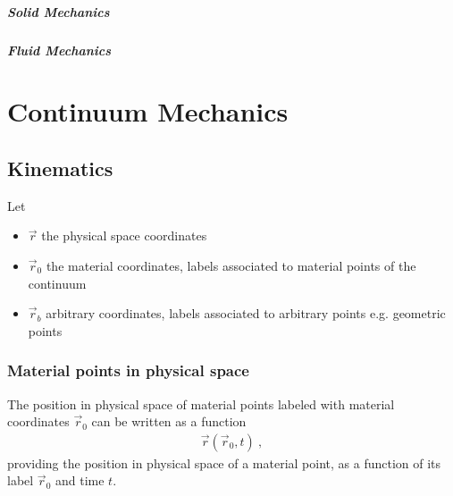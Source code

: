\documentclass[letterpaper,10pt,english]{jupyterBook}
\begin{document}
\subsubsection*{Solid Mechanics}
\subsubsection*{Fluid Mechanics}



\sphinxstepscope


\part{Continuum Mechanics}

\sphinxstepscope


\chapter{Kinematics}
\label{\detokenize{ch/continuum/kinematics:kinematics}}\label{\detokenize{ch/continuum/kinematics:continuum-kinematics}}\label{\detokenize{ch/continuum/kinematics::doc}}
\sphinxAtStartPar
Let
\begin{itemize}
\item {} 
\sphinxAtStartPar
\(\vec{r}\) the physical space coordinates

\item {} 
\sphinxAtStartPar
\(\vec{r}_0\) the material coordinates, labels associated to material points of the continuum

\item {} 
\sphinxAtStartPar
\(\vec{r}_b\) arbitrary coordinates, labels associated to arbitrary points \sphinxhyphen{} e.g. geometric points

\end{itemize}


\section{Material points in physical space}
\label{\detokenize{ch/continuum/kinematics:material-points-in-physical-space}}\label{\detokenize{ch/continuum/kinematics:continuum-kinematics-material-points}}
\sphinxAtStartPar
{} The position in physical space of material points labeled with material coordinates \(\vec{r}_0\) can be written as a function
\begin{equation}\label{equation:ch/continuum/kinematics:eq:r:r0-t}
\begin{split}\vec{r}(\vec{r}_0, t) \ ,\end{split}
\end{equation}
\sphinxAtStartPar
providing the position in physical space of a material point, as a function of its label \(\vec{r}_0\) and time \(t\).
\end{document}
